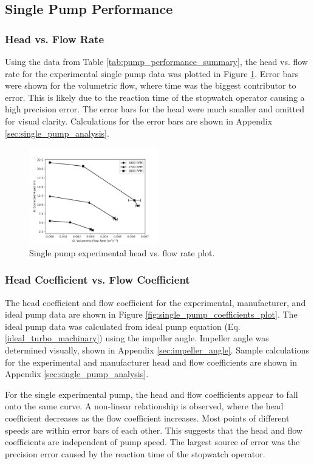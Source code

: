 \subsection{Single Pump Performance}
\subsubsection{Head vs. Flow Rate}
Using the data from Table \ref{tab:pump_performance_summary}, the head vs. flow rate for the experimental single pump data was plotted in Figure \ref{fig:single_pump_plot}. Error bars were shown for the volumetric flow, where time was the biggest contributor to error. This is likely due to the reaction time of the stopwatch operator causing a high precision error. The error bars for the head were much smaller and omitted for visual clarity. Calculations for the error bars are shown in Appendix \ref{sec:single_pump_analysis}. 
\begin{figure}[H]
    \centering
    \includegraphics[width=0.5\textwidth]{Sections/Figures/Single Pump Plot.png}
    \caption{Single pump experimental head vs. flow rate plot.}
    \label{fig:single_pump_plot}
\end{figure}

\subsubsection{Head Coefficient vs. Flow Coefficient}
The head coefficient and flow coefficient for the experimental, manufacturer, and ideal pump data are shown in Figure \ref{fig:single_pump_coefficients_plot}. The ideal pump data was calculated from ideal pump equation (Eq. \ref{ideal_turbo_machinary}) using the impeller angle. Impeller angle was determined visually, shown in Appendix \ref{sec:impeller_angle}. Sample calculations for the experimental and manufacturer head and flow coefficients are shown in Appendix \ref{sec:single_pump_analysis}.

For the single experimental pump, the head and flow coefficients appear to fall onto the same curve. A non-linear relationship is observed, where the head coefficient decreases as the flow coefficient increases. Most points of different speeds are within error bars of each other. This suggests that the head and flow coefficients are independent of pump speed. The largest source of error was the precision error caused by the reaction time of the stopwatch operator.

